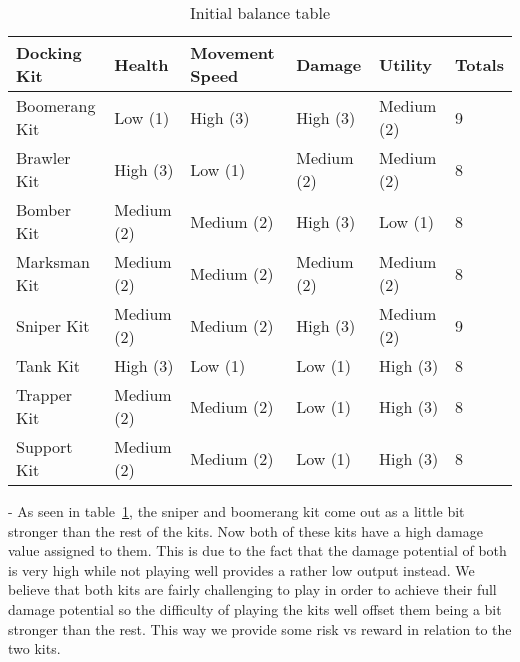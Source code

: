 \begin{table}[tbph]
\centering
\caption{Initial balance table}
\label{tab:initBalance}
\begin{tabular}{@{}llllll@{}}
\toprule
\textbf{Docking Kit} & \textbf{Health} & \textbf{Movement Speed} & \textbf{Damage} & \textbf{Utility} & \textbf{Totals} \\ \midrule
Boomerang Kit        & Low (1)         & High (3)                & High (3)        & Medium (2)       & 9               \\
Brawler Kit          & High (3)        & Low (1)                 & Medium (2)      & Medium (2)       & 8               \\
Bomber Kit           & Medium (2)      & Medium (2)              & High (3)        & Low (1)          & 8               \\
Marksman Kit         & Medium (2)      & Medium (2)              & Medium (2)      & Medium (2)       & 8               \\
Sniper Kit           & Medium (2)      & Medium (2)              & High (3)        & Medium (2)       & 9               \\
Tank Kit             & High (3)        & Low (1)                 & Low (1)         & High (3)         & 8               \\
Trapper Kit          & Medium (2)      & Medium (2)              & Low (1)         & High (3)         & 8               \\
Support Kit          & Medium (2)      & Medium (2)              & Low (1)         & High (3)         & 8               \\ \bottomrule
\end{tabular}
\end{table}
     
    - As seen in table~\ref{tab:initBalance}, the sniper and boomerang kit come out as a little bit stronger than the rest of the kits. Now both of these kits have a high damage value assigned to them. This is due to the fact that the damage potential of both is very high while not playing well provides a rather low output instead. We believe that both kits are fairly challenging to play in order to achieve their full damage potential so the difficulty of playing the kits well offset them being a bit stronger than the rest. This way we provide some risk vs reward in relation to the two kits. 


